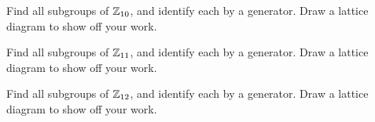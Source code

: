 \documentclass{ximera}
\begin{document}
\begin{exercise}
  Find all subgroups of $\mathbb Z_{10}$, and identify each by a generator. Draw
  a lattice diagram to show off your work.
\end{exercise}

\begin{exercise}
  Find all subgroups of $\mathbb Z_{11}$, and identify each by a generator. Draw
  a lattice diagram to show off your work.
\end{exercise}

\begin{exercise}
  Find all subgroups of $\mathbb Z_{12}$, and identify each by a generator.  Draw
  a lattice diagram to show off your work.
\end{exercise}

  







  
\end{document}
